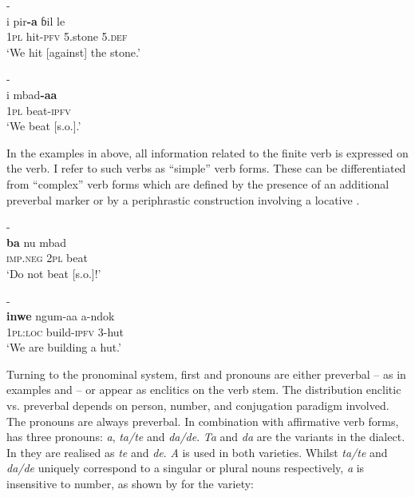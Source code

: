 \documentclass[output=paper
,newtxmath
,modfonts
,nonflat]{langsci/langscibook}
\begin{document}
\ea\label{ex:apel:2} 
\ea\label{ex:apel:2a}{- \citep[205]{Faye1979}}\\
\gll i pir\textbf{-a} ɓil le \\
     \textsc{1pl} hit-\textsc{pfv} 5.stone 5.\textsc{def}\\
\glt ‘We hit [against] the stone.’ 

\ex\label{ex:apel:2b} {- \citep[217]{Faye1979}}\\
\gll i mbad\textbf{-aa} \\
     \textsc{1pl} beat\textsc{-}\textsc{ipfv}   \\
\glt ‘We beat [s.o.].’
\z
\z

In the examples in  above, all information related to the finite verb is expressed on the verb. I refer to such verbs as “simple” verb forms. These can be differentiated from “complex” verb forms which are defined by the presence of an additional preverbal marker  or by a periphrastic construction involving a locative  .

\ea\label{ex:apel:3} 
\ea\label{ex:apel:3a}{- \citep[217]{Faye1979}}\\
\gll \textbf{ba} nu mbad\\
     \textsc{imp.neg} \textsc{2pl} beat\\
\glt ‘Do not beat [s.o.]!’ 

\ex\label{ex:apel:3b} {- \citep[248]{Faye1979}}\\
\gll \textbf{inwe} ngum-aa a-ndok\\
     1\textsc{pl:loc} build-\textsc{ipfv} 3-hut   \\
\glt  ‘We are building a hut.’
\z
\z

Turning to the pronominal system, first and   pronouns are either preverbal -- as in examples  and  -- or appear as enclitics on the verb stem. The distribution enclitic vs. preverbal depends on person, number, and conjugation paradigm involved. The   pronouns are always preverbal. In combination with affirmative verb forms,  has three   pronouns: \textit{a}, \textit{ta/te} and \textit{da/de}. \textit{Ta} and \textit{da} are the variants in the  dialect. In  they are realised as \textit{te} and \textit{de}. \textit{A} is used in both varieties. Whilst \textit{ta/te} and \textit{da/de} uniquely correspond to a singular or plural nouns respectively, \textit{a} is insensitive to number, as shown by  for the  variety:
\end{document}
